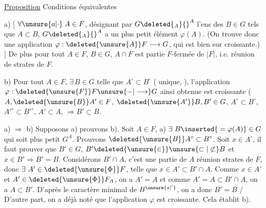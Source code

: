 \uline{Proposition} Conditions équivalentes

a) $[$ $\forall\unsure{a|\cdot}\;A\in F$, désignant par $G\deleted{{}_A}{}^A$ l'ens des $B\in G$ tels que $A\subset B$, $G\deleted{{}_A}{}^A$ a un plus petit
élément $\varphi(A)$. (On trouve donc une application $\varphi:\deleted{\unsure{A}}F\longrightarrow G$, qui est bien sur croissante.) $]$ De plus
pour tout $A\in F$, $B\in G$, $A\cap F$ est  partie $F$-fermée de $|F|$, i.e. réunion de strates de $F$.

b) Pour tout $A\in F$, $\exists\,B\in G$ telle que $A^\circ\subset B^\circ$ (  unique, ), l'application $\varphi:\deleted{\unsure{F}}F\unsure{-|\longrightarrow}G$ ainsi obtenue est croissante (
   $A,\deleted{\unsure{B}}A'\in F$, $\deleted{\unsure{A'}}B,B'\in G$,   $A^\circ\subset B^\circ$, $A'^\circ\subset B'^\circ$, $A'\subset A$, $\Longrightarrow B'\subset B$.

a) $\Longrightarrow$ b) Supposons a) prouvons b). Soit $A\in F$,  a) $\exists\ B\inserted{{}=\varphi(A)}\in G$  qui soit plus petit  $G^A$. Prouvons $\deleted{\unsure{B}}A^\circ\subset B^\circ$. Soit
$x\in A^\circ$, il faut prouver que $B'\in G$, $B'\deleted{\unsure{\in}}\unsure{\subset|\not\subset} B$ et $x\in B'\Longrightarrow B'=B$.  Considérons $B'\cap A$, c'est une partie de $A$ réunion  strates de $F$,
donc $\exists\ A'\in\deleted{\unsure{\Phi}}F$, telle que $x\in A'\subset B'\cap A$. Comme $x\in A^\circ$ et $A'\in\deleted{\unsure{\Phi}}F_A$, on a $A'=A$ et comme $A'=A\subset B'\cap A$, on a $A\subset B'$. D'après le caractère minimal de
$B^{\unsure{s|'}}$, on a donc $B'=B$  / D'autre part, on a déjà noté que l'application $\varphi$ est croissante. Cela établit b).

